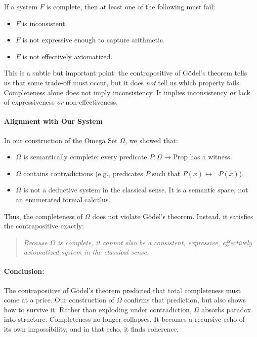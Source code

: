 \documentclass[12pt]{article}
\begin{document}
If a system \( F \) is complete, then at least one of the following must fail:

\begin{itemize}
    \item \( F \) is inconsistent.
    \item \( F \) is not expressive enough to capture arithmetic.
    \item \( F \) is not effectively axiomatized.
\end{itemize}

\noindent
This is a subtle but important point: the contrapositive of Gödel’s theorem tells us that some trade-off must occur, but it does \textit{not} tell us which property fails. Completeness alone does not imply inconsistency. It implies inconsistency \textit{or} lack of expressiveness \textit{or} non-effectiveness.

\paragraph{Alignment with Our System}

In our construction of the Omega Set \( \Omega \), we showed that:

\begin{itemize}
    \item \( \Omega \) is semantically complete: every predicate \( P : \Omega \to \text{Prop} \) has a witness.
    \item \( \Omega \) contains contradictions (e.g., predicates \( P \) such that \( P(x) \leftrightarrow \neg P(x) \)).
    \item \( \Omega \) is not a deductive system in the classical sense. It is a semantic space, not an enumerated formal calculus.
\end{itemize}

Thus, the completeness of \( \Omega \) does not violate Gödel’s theorem. Instead, it satisfies the contrapositive exactly:

\begin{quote}
\textit{Because \( \Omega \) is complete, it cannot also be a consistent, expressive, effectively axiomatized system in the classical sense.}
\end{quote}

\paragraph{Conclusion:}

The contrapositive of Gödel’s theorem predicted that total completeness must come at a price. Our construction of \( \Omega \) confirms that prediction, but also shows how to survive it. Rather than exploding under contradiction, \( \Omega \) absorbs paradox into structure. Completeness no longer collapses. It becomes a recursive echo of its own impossibility, and in that echo, it finds coherence.
\end{document}

